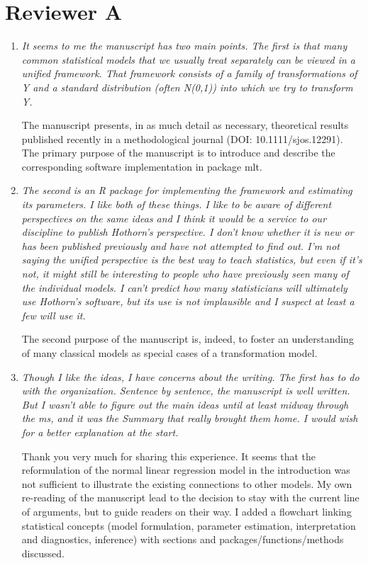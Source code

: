 \documentclass[12pt]{article}
\begin{document}
\section*{Reviewer A}

\begin{enumerate}

\item \textit{It seems to me the manuscript has two main points.  The first
is that many common statistical models that we usually treat separately can
be viewed in a unified framework.  That framework consists of a family of
transformations of Y and a standard distribution (often N(0,1)) into which
we try to transform Y.}

The manuscript presents, in as much detail as necessary, theoretical results
published recently in a methodological journal (DOI: 10.1111/sjos.12291).
The primary purpose of the manuscript is to introduce and describe the
corresponding software implementation in package mlt.

\item \textit{ The second is an R package for implementing the
framework and estimating its parameters.  I like both of these things.  I
like to be aware of different perspectives on the same ideas and I think it
would be a service to our discipline to publish Hothorn’s perspective.  I
don’t know whether it is new or has been published previously and have not
attempted to find out.  I’m not saying the unified perspective is the best
way to teach statistics, but even if it’s not, it might still be interesting
to people who have previously seen many of the individual models.  I can’t
predict how many statisticians will ultimately use Hothorn’s software, but
its use is not implausible and I suspect at least a few will use it.}

The second purpose of the manuscript is, indeed, to foster an understanding
of many classical models as special cases of a transformation model.

\item \textit{Though I like the ideas, I have concerns about the writing. 
The first has to do with the organization.  Sentence by sentence, the
manuscript is well written.  But I wasn’t able to figure out the main ideas
until at least midway through the ms, and it was the Summary that really
brought them home. I would wish for a better explanation at the start.}

Thank you very much for sharing this experience. It seems that the
reformulation of the normal linear regression model in the introduction was
not sufficient to illustrate the existing connections to other models. My
own re-reading of the manuscript lead to the decision to stay with the
current line of arguments, but to guide readers on their way. I added a
flowchart linking statistical concepts (model formulation, parameter
estimation, interpretation and diagnostics, inference) with sections and
packages/functions/methods discussed.


\end{enumerate}
\end{document}
